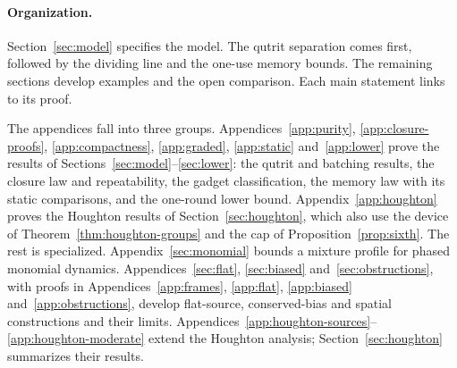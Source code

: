 \paragraph{Organization.}
Section~\ref{sec:model} specifies the model. The qutrit separation comes
first, followed by the dividing line and the one-use memory bounds. The
remaining sections develop examples and the open comparison. Each main
statement links to its proof.

The appendices fall into three groups. Appendices~\ref{app:purity},
\ref{app:closure-proofs}, \ref{app:compactness}, \ref{app:graded},
\ref{app:static} and~\ref{app:lower} prove the results of
Sections~\ref{sec:model}--\ref{sec:lower}: the qutrit and batching
results, the closure law and repeatability, the gadget classification,
the memory law with its static comparisons, and the one-round lower
bound. Appendix~\ref{app:houghton} proves the Houghton results of
Section~\ref{sec:houghton}, which also use the device of
Theorem~\ref{thm:houghton-groups} and the cap of
Proposition~\ref{prop:sixth}. The rest is specialized.
Appendix~\ref{sec:monomial} bounds a mixture profile for phased monomial
dynamics. Appendices~\ref{sec:flat}, \ref{sec:biased}
and~\ref{sec:obstructions}, with proofs in Appendices~\ref{app:frames},
\ref{app:flat}, \ref{app:biased} and~\ref{app:obstructions}, develop
flat-source, conserved-bias and spatial constructions and their limits.
Appendices~\ref{app:houghton-sources}--\ref{app:houghton-moderate} extend
the Houghton analysis; Section~\ref{sec:houghton} summarizes their
results.
